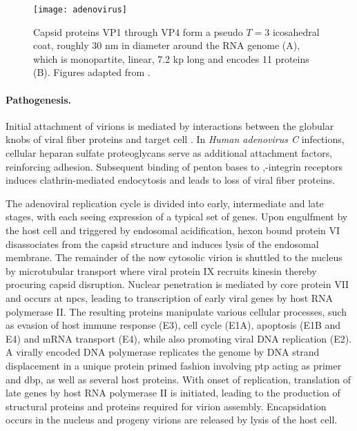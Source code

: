 \begin{figure}
  \centering
  \texttt{[image: adenovirus]}
  \caption[Capsid structure and genome of rhinoviruses.]{Capsid proteins VP1 through VP4 form a pseudo $T=3$ icosahedral coat, roughly 30 nm in diameter around the RNA genome (A), which is monopartite, linear, 7.2 kp long and encodes 11 proteins (B). Figures adapted from \cite{Hulo2011}.}
  \label{fig:adenovirus}
\end{figure}

\paragraph{Pathogenesis.}
Initial attachment of virions is mediated by interactions between the globular knobs of viral fiber proteins and target cell . In \textit{Human adenovirus C} infections, cellular heparan sulfate proteoglycans serve as additional attachment factors, reinforcing adhesion. Subsequent binding of penton bases to \textalpha,\textbeta-integrin receptors induces clathrin-mediated endocytosis and leads to loss of viral fiber proteins.

The adenoviral replication cycle is divided into early, intermediate and late stages, with each seeing expression of a typical set of genes. Upon engulfment by the host cell and triggered by endosomal acidification, hexon bound protein VI disassociates from the capsid structure and induces lysis of the endosomal membrane. The remainder of the now cytosolic virion is shuttled to the nucleus by microtubular transport where viral protein IX recruits kinesin thereby procuring capsid disruption. Nuclear penetration is mediated by core protein VII and occurs at \glspl{npc}, leading to transcription of early viral genes by host RNA polymerase II. The resulting proteins manipulate various cellular processes, such as evasion of host immune response (E3), cell cycle (E1A), apoptosis (E1B and E4) and mRNA transport (E4), while also promoting viral DNA replication (E2). A virally encoded DNA polymerase replicates the genome by DNA strand displacement in a unique protein primed fashion involving \gls{ptp} acting as primer and \gls{dbp}, as well as several host proteins. With onset of replication, translation of late genes by host RNA polymerase II is initiated, leading to the production of structural proteins and proteins required for virion assembly. Encapsidation occurs in the nucleus and progeny virions are released by lysis of the host cell.

